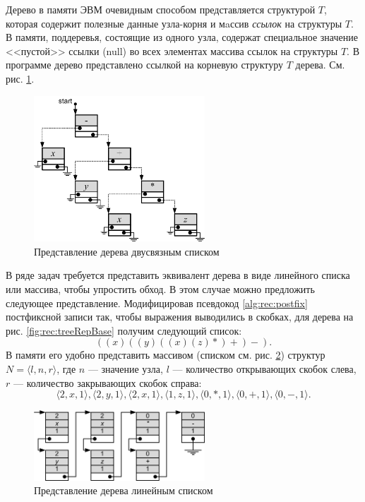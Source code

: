 Дерево в памяти ЭВМ очевидным способом представляется структурой $T$, которая содержит полезные данные узла-корня и мaссив \emph{ссылок} на структуры $T$. В памяти, поддеревья, состоящие из одного узла, содержат специальное значение <<пустой>> ссылки (null) во всех элементах массива ссылок на структуры $T$. В программе дерево представлено ссылкой на корневую структуру $T$ дерева. См. рис. \ref{fig:rec:treeRepList}. 
\begin{figure}
    \centering
    \includegraphics[width=0.57\textwidth]{fig/treeRepList.png}
    \caption{Представление дерева двусвязным списком}
    \label{fig:rec:treeRepList}
\end{figure}

В ряде задач требуется представить эквивалент дерева в виде линейного списка или массива, чтобы упростить обход. В этом случае можно предложить следующее представление. Модифицировав псевдокод \ref{alg:rec:postfix} постфиксной записи так, чтобы выражения выводились в скобках, для дерева на рис. \ref{fig:rec:treeRepBase} получим следующий список:
\[
    ((x)((y)((x)(z)*)+)-).
\]
В памяти его удобно представить массивом (списком см. рис. \ref{fig:rec:treeRepLinearList}) структур $N=\langle l,n,r\rangle$, где $n$ --- значение узла, $l$ --- количество открывающих скобок слева, $r$ --- количество закрывающих скобок справа:
\[
    \langle 2,x,1\rangle,
    \langle 2,y,1\rangle, 
    \langle 2,x,1\rangle,
    \langle 1,z,1\rangle,
    \langle 0,*,1\rangle,
    \langle 0,+,1\rangle,
    \langle 0,-,1\rangle.
\]

\begin{figure}
    \centering
    \includegraphics[width=0.57\textwidth]{fig/treeRepLinearList}
    \caption{Представление дерева линейным списком}
    \label{fig:rec:treeRepLinearList}
\end{figure}

